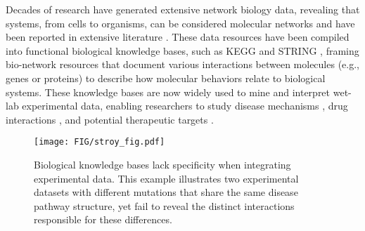 Decades of research have generated extensive network biology data, revealing that systems, from cells to organisms, can be considered molecular networks and have been reported in extensive literature \cite{Network_1,Network_2,Network_3}.
These data resources have been compiled into functional biological knowledge bases, such as KEGG \cite{kanehisa2000kegg} and STRING \cite{DataSTRING}, framing bio-network resources \cite{GRN,PPI} that document various interactions between molecules (e.g., genes or proteins) to describe how molecular behaviors relate to biological systems.
These knowledge bases are now widely used to mine and interpret wet-lab experimental data, enabling researchers to study disease mechanisms \cite{DB_1}, drug interactions \cite{DB_2}, and potential therapeutic targets \cite{DB_3}.



\begin{figure}[t]
\centering 
\texttt{[image: FIG/stroy\_fig.pdf]}
\caption{Biological knowledge bases lack specificity when integrating experimental data. This example illustrates two experimental datasets with different mutations that share the same disease pathway structure, yet fail to reveal the distinct interactions responsible for these differences.}
\label{fig:story_fig}
\end{figure}


